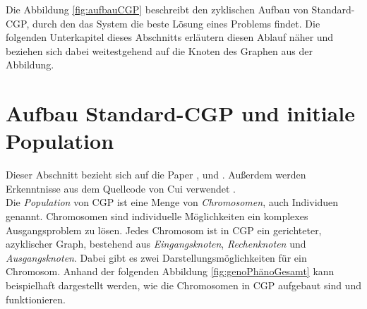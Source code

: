 Die Abbildung \ref{fig:aufbauCGP} beschreibt den zyklischen Aufbau von Standard-CGP, durch den das System die beste Lösung eines Problems findet.
Die folgenden Unterkapitel dieses Abschnitts erläutern diesen Ablauf näher und beziehen sich dabei weitestgehend auf die Knoten des Graphen aus der Abbildung.


\section{Aufbau Standard-CGP und initiale Population}
\label{sec:initialePopulation}
Dieser Abschnitt bezieht sich auf die Paper \cite{miller_cartesian_2020}, \cite{torabi_using_2022} und \cite{milad_taleby_ahvanooey_survey_2019}.
Außerdem werden Erkenntnisse aus dem Quellcode von Cui verwendet \cite{cuihen_cuihencgp_with_crossover_strategies_2024}.\\
Die \emph{Population} von CGP ist eine Menge von \emph{Chromosomen}, auch Individuen genannt.
Chromosomen sind individuelle Möglichkeiten ein komplexes Ausgangsproblem zu lösen.
Jedes Chromosom ist in CGP ein gerichteter, azyklischer Graph, bestehend aus \emph{Eingangsknoten}, \emph{Rechenknoten} und \emph{Ausgangsknoten}.
Dabei gibt es zwei Darstellungsmöglichkeiten für ein Chromosom. 
Anhand der folgenden Abbildung \ref{fig:genoPhänoGesamt} kann beispielhaft dargestellt werden, wie die Chromosomen in CGP aufgebaut sind und funktionieren.

